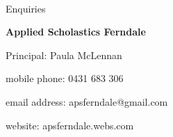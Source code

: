 \documentclass{article}
\begin{document}
\newpage
\
\newpage
\
\newpage
\
\newpage
\
\newpage
\
\newpage
\
\newpage
\

\begin{center}
\linespread{2}\large

Enquiries

\textbf{Applied Scholastics Ferndale}

Principal: Paula McLennan

mobile phone: 0431 683 306

email address: apsferndale@gmail.com

website: apsferndale.webs.com
\end{center}
\end{document}
